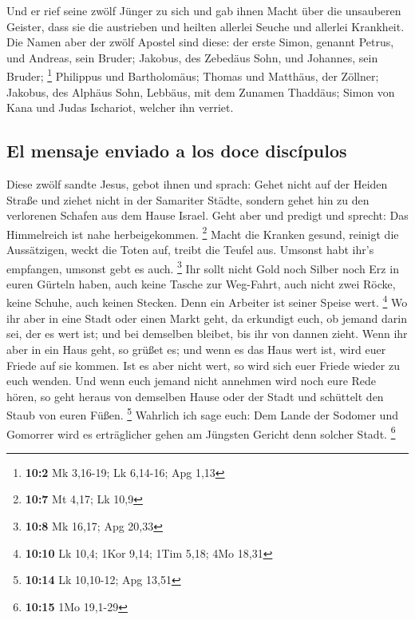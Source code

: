  Und er rief seine zwölf Jünger zu sich und gab ihnen
Macht über die unsauberen Geister, dass sie die austrieben und heilten
allerlei Seuche und allerlei Krankheit.  Die Namen aber
der zwölf Apostel sind diese: der erste Simon, genannt Petrus, und
Andreas, sein Bruder; Jakobus, des Zebedäus Sohn, und Johannes, sein
Bruder; \footnote{\textbf{10:2} Mk 3,16-19; Lk 6,14-16; Apg 1,13}
 Philippus und Bartholomäus; Thomas und Matthäus, der
Zöllner; Jakobus, des Alphäus Sohn, Lebbäus, mit dem Zunamen Thaddäus;
 Simon von Kana und Judas Ischariot, welcher ihn verriet.

\hypertarget{el-mensaje-enviado-a-los-doce-discuxedpulos}{%
\subsection{El mensaje enviado a los doce
discípulos}\label{el-mensaje-enviado-a-los-doce-discuxedpulos}}

 Diese zwölf sandte Jesus, gebot ihnen und sprach: Gehet
nicht auf der Heiden Straße und ziehet nicht in der Samariter Städte,
 sondern gehet hin zu den verlorenen Schafen aus dem Hause
Israel.  Geht aber und predigt und sprecht: Das
Himmelreich ist nahe herbeigekommen. \footnote{\textbf{10:7} Mt 4,17; Lk
  10,9}  Macht die Kranken gesund, reinigt die
Aussätzigen, weckt die Toten auf, treibt die Teufel aus. Umsonst habt
ihr's empfangen, umsonst gebt es auch. \footnote{\textbf{10:8} Mk 16,17;
  Apg 20,33}  Ihr sollt nicht Gold noch Silber noch Erz in
euren Gürteln haben,  auch keine Tasche zur Weg-Fahrt,
auch nicht zwei Röcke, keine Schuhe, auch keinen Stecken. Denn ein
Arbeiter ist seiner Speise wert. \footnote{\textbf{10:10} Lk 10,4; 1Kor
  9,14; 1Tim 5,18; 4Mo 18,31}  Wo ihr aber in eine Stadt
oder einen Markt geht, da erkundigt euch, ob jemand darin sei, der es
wert ist; und bei demselben bleibet, bis ihr von dannen zieht.
 Wenn ihr aber in ein Haus geht, so grüßet es;
 und wenn es das Haus wert ist, wird euer Friede auf sie
kommen. Ist es aber nicht wert, so wird sich euer Friede wieder zu euch
wenden.  Und wenn euch jemand nicht annehmen wird noch
eure Rede hören, so geht heraus von demselben Hause oder der Stadt und
schüttelt den Staub von euren Füßen. \footnote{\textbf{10:14} Lk
  10,10-12; Apg 13,51}  Wahrlich ich sage euch: Dem Lande
der Sodomer und Gomorrer wird es erträglicher gehen am Jüngsten Gericht
denn solcher Stadt. \footnote{\textbf{10:15} 1Mo 19,1-29}

